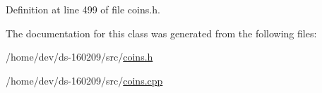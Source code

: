 Definition at line 499 of file coins.\+h.



The documentation for this class was generated from the following files\+:\begin{DoxyCompactItemize}
\item 
/home/dev/ds-\/160209/src/\hyperlink{coins_8h}{coins.\+h}\item 
/home/dev/ds-\/160209/src/\hyperlink{coins_8cpp}{coins.\+cpp}\end{DoxyCompactItemize}

